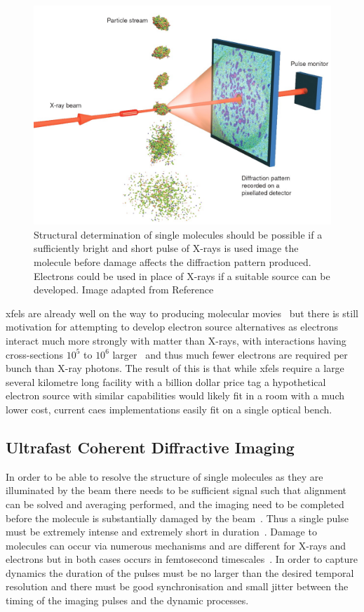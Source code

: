 \begin{figure}
    \center
    \includegraphics[width=0.65\linewidth]{0intro/Figs/single_molecule_cdi.jpg}
    \caption{Structural determination of single molecules should be possible if a sufficiently bright and short pulse of X-rays is used image the molecule before damage affects the diffraction pattern produced. Electrons could be used in place of X-rays if a suitable source can be developed. Image adapted from Reference~\cite{gaffney_imaging_2007}}
    \label{figure:molecule_cdi}
\end{figure}

\Glspl{xfel} are already well on the way to producing molecular movies~\cite{pande_femtosecond_2016,nango_three-dimensional_2016} but there is still motivation for attempting to develop electron source alternatives as electrons interact much more strongly with matter than X-rays, with interactions having cross-sections $10^5$ to $10^6$ larger~\cite{sciaini_femtosecond_2011} and thus much fewer electrons are required per bunch than X-ray photons.
The result of this is that while \glspl{xfel} require a large several kilometre long facility with a billion dollar price tag a hypothetical electron source with similar capabilities would likely fit in a room with a much lower cost, current \gls{caes} implementations easily fit on a single optical bench.

\subsection{Ultrafast Coherent Diffractive Imaging}

In order to be able to resolve the structure of single molecules as they are illuminated by the beam there needs to be sufficient signal such that alignment can be solved and averaging performed, and the imaging need to be completed before the molecule is substantially damaged by the beam~\cite{huldt_diffraction_2003}.
Thus a single pulse must be extremely intense and extremely short in duration~\cite{chapman_femtosecond_2006}.
Damage to molecules can occur via numerous mechanisms and are different for X-rays and electrons but in both cases occurs in femtosecond timescales~\cite{spence_outrunning_2017}.
In order to capture dynamics the duration of the pulses must be no larger than the desired temporal resolution and there must be good synchronisation and small jitter between the timing of the imaging pulses and the dynamic processes.

